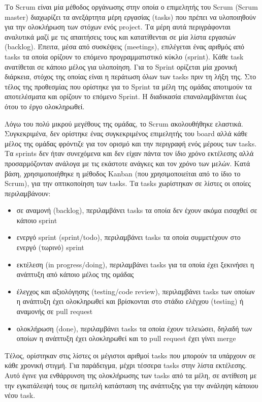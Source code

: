 Το Scrum είναι μία μέθοδος οργάνωσης στην οποία ο επιμελητής του Scrum (Scrum master) διαχωρίζει τα ανεξάρτητα μέρη εργασίας (tasks) που πρέπει να υλοποιηθούν για την ολοκλήρωση των στόχων ενός project. Τα μέρη αυτά περιγράφονται αναλυτικά μαζί με τις απαιτήσεις τους και κατατίθενται σε μία λίστα εργασιών (backlog). Έπειτα, μέσα από συσκέψεις (meetings), επιλέγεται ένας αριθμός από tasks τα οποία ορίζουν το επόμενο προγραμματιστικό κύκλο (sprint). Κάθε task ανατίθεται σε κάποιο μέλος για υλοποίηση. Για το Sprint ορίζεται μία χρονική διάρκεια, στόχος της οποίας είναι η περάτωση όλων των tasks πριν τη λήξη της. Στο τέλος της προθεσμίας που ορίστηκε για το Sprint τα μέλη της ομάδας αποτιμούν τα αποτελέσματα και ορίζουν το επόμενο Sprint. Η διαδικασία επαναλαμβάνεται έως ότου το έργο ολοκληρωθεί.

Λόγω του πολύ μικρού μεγέθους της ομάδας, το Scrum ακολουθήθηκε ελαστικά. Συγκεκριμένα, δεν ορίστηκε ένας συγκεκριμένος επιμελητής του board αλλά κάθε μέλος της ομάδας φρόντιζε για τον ορισμό και την περιγραφή ενός μέρους των tasks. Τα sprints δεν ήταν συνεχόμενα και δεν είχαν πάντα τον ίδιο χρόνο εκτέλεσης αλλά προσαρμόζονταν ανάλογα με τις εκάστοτε ανάγκες και τον χρόνο των μελών. Κατά βάση, χρησιμοποιήθηκε η μέθοδος Kanban (που χρησιμοποιείται από το ίδιο το Scrum), για την οπτικοποίηση των tasks. Τα tasks χωρίστηκαν σε λίστες οι οποίες περιλαμβάνουν:

\begin{itemize}
    \item σε αναμονή (backlog), περιλαμβάνει tasks τα οποία δεν έχουν ακόμα εισαχθεί σε κάποιο sprint
    \item ενεργό sprint (sprint/todo), περιλαμβάνει tasks τα οποία συμμετέχουν στο ενεργό (τωρινό) sprint
    \item εκτέλεση (in progress/doing), περιλαμβάνει tasks για τα οποία έχει ξεκινήσει η ανάπτυξη από κάποιο μέλος της ομάδας
    \item έλεγχος και αξιολόγησης (testing/code review), περιλαμβάνει tasks των οποίων η ανάπτυξη έχει ολοκληρωθεί και βρίσκονται στο στάδιο ελέγχου (testing) ή αναμονής σε pull request
    \item ολοκλήρωση (done), περιλαμβάνει tasks τα οποία έχουν τελειώσει, δηλαδή των οποίων η ανάπτυξη έχει ολοκληρωθεί και το pull request έχει γίνει merge
\end{itemize}

Τέλος, ορίστηκαν στις λίστες οι μέγιστοι αριθμοί tasks που μπορούν τα υπάρχουν σε κάθε χρονική στιγμή. Για παράδειγμα, μέχρι τέσσερα tasks στην λίστα εκτέλεσης. Αυτό έγινε για ενθάρρυνση της ολοκλήρωσης των tasks από τα μέλη, σε αντίθεση με την εγκατάλειψή τους σε ημιτελή κατάσταση της ανάπτυξης για την ανάληψη κάποιου νέου task.

